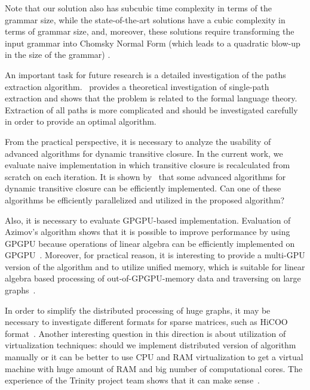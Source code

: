 Note that our solution also has subcubic time complexity in terms of the grammar size, while the state-of-the-art solutions have a cubic complexity in terms of grammar size, and, moreover, these solutions require transforming the input grammar into Chomsky Normal Form (which leads to a quadratic blow-up in the size of the grammar) \citep{Azimov:2018:CPQ:3210259.3210264, hellingsRelational, hellingsPathQuerying, 10.1145/258994.259006, 10.1145/3398682.3399163}.


An important task for future research is a detailed investigation of the paths extraction algorithm.~\cite{HellSinglePath} provides a theoretical investigation of single-path extraction and shows that the problem is related to the formal language theory.
Extraction of all paths is more complicated and should be investigated carefully in order to provide an optimal algorithm.


From the practical perspective, it is necessary to analyze the usability of advanced algorithms for dynamic transitive closure.
In the current work, we evaluate naive implementation in which transitive closure is recalculated from scratch on each iteration.
It is shown by~\cite{cs6345} that some advanced algorithms for dynamic transitive closure can be efficiently implemented.
Can one of these algorithms be efficiently parallelized and utilized in the proposed algorithm?


Also, it is necessary to evaluate GPGPU-based implementation.
Evaluation of Azimov's algorithm shows that it is possible to improve performance by using GPGPU because operations of linear algebra can be efficiently implemented on GPGPU~\citep{Mishin:2019:ECP:3327964.3328503,10.1145/3398682.3399163}.
Moreover, for practical reason, it is interesting to provide a multi-GPU version of the algorithm and to utilize unified memory, which is suitable for linear algebra based processing of out-of-GPGPU-memory data and traversing on large graphs~\citep{8946118,10.14778/3384345.3384358}.

In order to simplify the distributed processing of huge graphs, it may be necessary to investigate different formats for sparse matrices, such as HiCOO format~\citep{10.5555/3291656.3291682}.
Another interesting question in this direction is about utilization of virtualization techniques: should we implement distributed version of algorithm manually or it can be better to use CPU and RAM virtualization to get a virtual machine with huge amount of RAM and big number of computational cores.
The experience of the Trinity project team shows that it can make sense~\citep{10.1145/2463676.2467799}.

